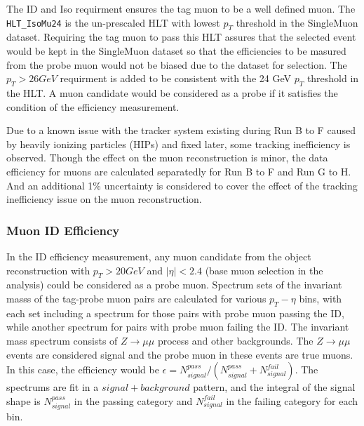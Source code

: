 The ID and Iso requirment ensures the tag muon to be a well defined muon. The \texttt{HLT_IsoMu24} is the un-prescaled HLT with lowest $p_T$ threshold in the SingleMuon dataset. Requiring the tag muon to pass this HLT assures that the selected event would be kept in the SingleMuon dataset so that the efficiencies to be masured from the probe muon would not be biased due to the dataset for selection. The $p_T > 26 GeV$ requirment is added to be consistent with the 24 GeV $p_T$ threshold in the HLT. A muon candidate would be considered as a probe if it satisfies the condition of the efficiency measurement. 

\vspace{0.3cm}
Due to a known issue with the tracker system existing during Run B to F caused by heavily ionizing particles (HIPs) and fixed later, some tracking inefficiency is observed. Though the effect on the muon reconstruction is minor, the data efficiency for muons are calculated separatedly for Run B to F and Run G to H. And an additional 1\% uncertainty is considered to cover the effect of the tracking inefficiency issue on the muon reconstruction.

\subsubsection{Muon ID Efficiency}
In the ID efficiency measurement, any muon candidate from the object reconstruction with $p_T > 20GeV$ and $|\eta|<2.4$ (base muon selection in the analysis) could be considered as a probe muon. Spectrum sets of the invariant masss of the tag-probe muon pairs are calculated for various $p_T - \eta$ bins, with each set including a spectrum for those pairs with probe muon passing the ID, while another spectrum for pairs with probe muon failing the ID. The invariant mass spectrum consists of $Z\rightarrow \mu\mu$ process and other backgrounds. The $Z\rightarrow \mu\mu$ events are considered signal and the probe muon in these events are true muons. In this case, the efficiency would be $\epsilon=N_{signal}^{pass}/(N_{signal}^{pass}+N_{signal}^{fail})$. The spectrums are fit in a $signal+background$ pattern, and the integral of the signal shape is $N_{signal}^{pass}$ in the passing category and $N_{signal}^{fail}$ in the failing category for each bin. 

